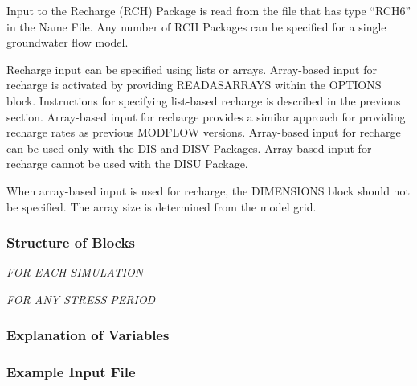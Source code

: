 
Input to the Recharge (RCH) Package is read from the file that has type ``RCH6'' in the Name File.  Any number of RCH Packages can be specified for a single groundwater flow model.

Recharge input can be specified using lists or arrays.  Array-based input for recharge is activated by providing READASARRAYS within the OPTIONS block.   Instructions for specifying list-based recharge is described in the previous section.  Array-based input for recharge provides a similar approach for providing recharge rates as previous MODFLOW versions.  Array-based input for recharge can be used only with the DIS and DISV Packages.  Array-based input for recharge cannot be used with the DISU Package.

When array-based input is used for recharge, the DIMENSIONS block should not be specified.  The array size is determined from the model grid. 

\vspace{5mm}
\subsubsection{Structure of Blocks}
\vspace{5mm}

\noindent \textit{FOR EACH SIMULATION}

\vspace{5mm}
\noindent \textit{FOR ANY STRESS PERIOD}


\vspace{5mm}
\subsubsection{Explanation of Variables}
\begin{description}

\end{description}

\vspace{5mm}
\subsubsection{Example Input File}



